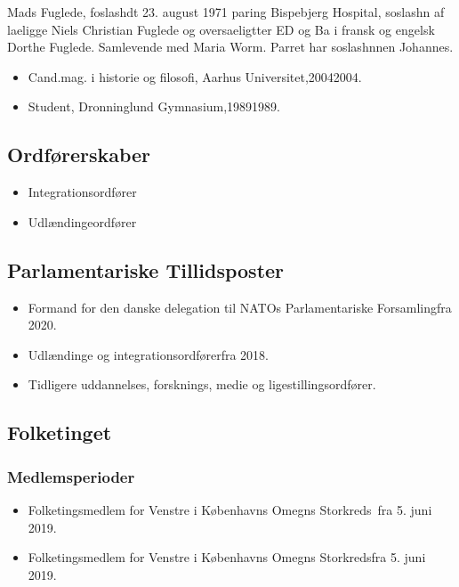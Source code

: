 \documentclass[11pt, a4paper]{awesome-cv}
\begin{document}
\makecvheader[R]
\makelettertitle
\begin{cvletter}
Mads Fuglede, foslashdt 23. august 1971 paring Bispebjerg Hospital, soslashn af laeligge Niels Christian Fuglede og oversaeligtter ED og Ba i fransk og engelsk Dorthe Fuglede. Samlevende med Maria Worm. Parret har soslashnnen Johannes.

\begin{itemize}
\item Cand.mag. i historie og filosofi, Aarhus Universitet,20042004.
\item Student, Dronninglund Gymnasium,19891989.
\end{itemize}
\subsection*{Ordførerskaber}
\begin{itemize}
\item Integrationsordfører
\item Udlændingeordfører
\end{itemize}
\subsection*{Parlamentariske Tillidsposter}
\begin{itemize}
\item Formand for den danske delegation til NATOs Parlamentariske Forsamlingfra 2020.
\item Udlændinge og integrationsordførerfra 2018.
\item Tidligere uddannelses, forsknings, medie og ligestillingsordfører.
\end{itemize}
\subsection*{Folketinget}
\subsubsection*{Medlemsperioder}
\begin{itemize}
\item Folketingsmedlem for Venstre i Københavns Omegns Storkreds fra 5. juni 2019.
\item Folketingsmedlem for Venstre i Københavns Omegns Storkredsfra 5. juni 2019.
\end{itemize}

\end{cvletter}
\end{document}

